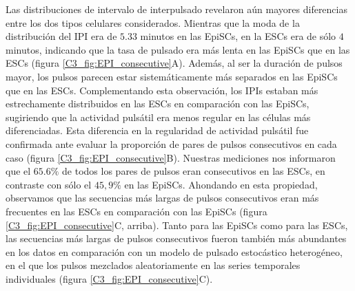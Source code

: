 \documentclass[./main.tex]{subfiles}
\begin{document}
Las distribuciones de intervalo de interpulsado revelaron aún mayores diferencias entre los dos tipos celulares considerados. Mientras que la moda de la distribución del IPI era de $5.33$ minutos en las EpiSCs, en la ESCs era de sólo $4$ minutos, indicando que la tasa de pulsado era más lenta en las EpiSCs que en las ESCs (figura \ref{C3_fig:EPI_consecutive}A). Además, al ser la duración de pulsos mayor, los pulsos parecen estar sistemáticamente más separados en las EpiSCs que en las ESCs. Complementando esta observación, los IPIs estaban más estrechamente distribuidos en las ESCs en comparación con las EpiSCs, sugiriendo que la actividad pulsátil era menos regular en las células más diferenciadas. Esta diferencia en la regularidad de actividad pulsátil fue confirmada ante evaluar la proporción de pares de pulsos consecutivos en cada caso (figura \ref{C3_fig:EPI_consecutive}B). Nuestras mediciones nos informaron que el $65.6\%$ de todos los pares de pulsos eran consecutivos en las ESCs, en contraste con sólo el $45,9\%$ en las EpiSCs. Ahondando en esta propiedad, observamos que las secuencias más largas de pulsos consecutivos eran más frecuentes en las ESCs en comparación con las EpiSCs (figura \ref{C3_fig:EPI_consecutive}C, arriba). Tanto para las EpiSCs como para las ESCs, las secuencias más largas de pulsos consecutivos fueron también más abundantes en los datos en comparación con un modelo de pulsado estocástico heterogéneo, en el que los pulsos mezclados aleatoriamente en las series temporales individuales (figura \ref{C3_fig:EPI_consecutive}C). 
\end{document}
